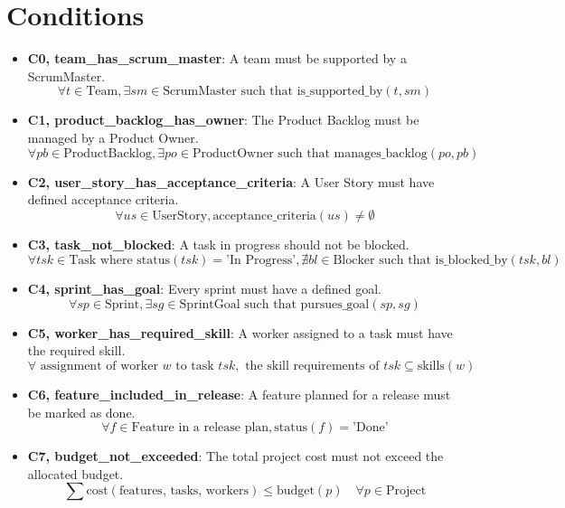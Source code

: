 \documentclass[11pt]{article}
\begin{document}
\section{Conditions}
\begin{itemize}
    \item \textbf{C0, team\_has\_scrum\_master}: A team must be supported by a ScrumMaster.
        \[ \forall t \in \text{Team}, \exists sm \in \text{ScrumMaster} \text{ such that } \text{is\_supported\_by}(t, sm) \]
    \item \textbf{C1, product\_backlog\_has\_owner}: The Product Backlog must be managed by a Product Owner.
        \[ \forall pb \in \text{ProductBacklog}, \exists po \in \text{ProductOwner} \text{ such that } \text{manages\_backlog}(po, pb) \]
    \item \textbf{C2, user\_story\_has\_acceptance\_criteria}: A User Story must have defined acceptance criteria.
        \[ \forall us \in \text{UserStory}, \text{acceptance\_criteria}(us) \neq \emptyset \]
    \item \textbf{C3, task\_not\_blocked}: A task in progress should not be blocked.
        \[ \forall tsk \in \text{Task} \text{ where } \text{status}(tsk) = \text{'In Progress'}, \nexists bl \in \text{Blocker} \text{ such that } \text{is\_blocked\_by}(tsk, bl) \]
    \item \textbf{C4, sprint\_has\_goal}: Every sprint must have a defined goal.
        \[ \forall sp \in \text{Sprint}, \exists sg \in \text{SprintGoal} \text{ such that } \text{pursues\_goal}(sp, sg) \]
    \item \textbf{C5, worker\_has\_required\_skill}: A worker assigned to a task must have the required skill.
        \[ \forall \text{ assignment of worker } w \text{ to task } tsk, \text{ the skill requirements of } tsk \subseteq \text{skills}(w) \]
    \item \textbf{C6, feature\_included\_in\_release}: A feature planned for a release must be marked as done.
        \[ \forall f \in \text{Feature} \text{ in a release plan}, \text{status}(f) = \text{'Done'} \]
    \item \textbf{C7, budget\_not\_exceeded}: The total project cost must not exceed the allocated budget.
        \[ \sum \text{cost}(\text{features, tasks, workers}) \leq \text{budget}(p) \quad \forall p \in \text{Project} \]
\end{itemize}
\end{document}
